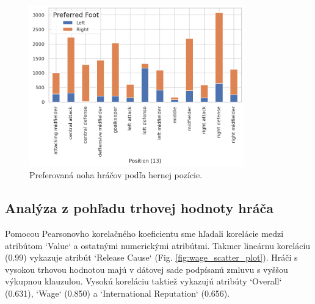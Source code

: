 \documentclass[runningheads]{llncs}
\begin{document}
\begin{figure}[htp]
    \centering
    \includegraphics[height=7cm]{images/preferred_foot_counts}
    \caption{Preferovaná noha hráčov podľa hernej pozície.}
    \label{fig:preferred_foot_counts}
\end{figure}


\subsection{Analýza z pohľadu trhovej hodnoty hráča} \label{analyza_z_pohladu_trhovej_hodnoty}
Pomocou Pearsonovho korelačného koeficientu sme hľadali korelácie medzi atribútom `Value` a ostatnými numerickými atribútmi. Takmer lineárnu koreláciu (0.99) vykazuje atribút `Release Cause` (Fig. \ref{fig:wage_scatter_plot}). Hráči s vysokou trhovou hodnotou majú v dátovej sade podpísanú zmluvu s vyššou výkupnou klauzulou. Vysokú koreláciu taktiež vykazujú atribúty `Overall` (0.631), `Wage` (0.850) a `International Reputation` (0.656).
\end{document}
